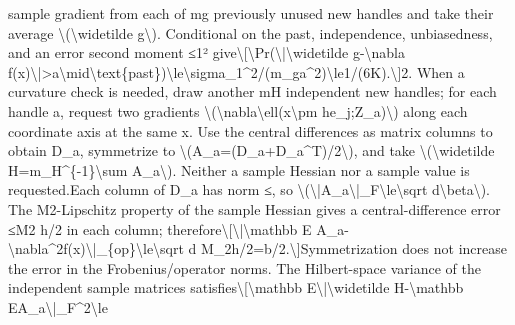 \documentclass[10pt,a4paper]{article}
\begin{document}
sample gradient from each of mg previously unused new handles and take their average \textbackslash{}(\textbackslash{}widetilde g\textbackslash{}). Conditional on the past,\allowbreak{} independence,\allowbreak{} unbiasedness,\allowbreak{} and an error second moment {\AtlasUnicodeSymbols ≤}\allowbreak{}1{\AtlasUnicodeText ²}\allowbreak{} give\newline{}\textbackslash{}[\newline{}\textbackslash{}Pr(\textbackslash{}|\textbackslash{}widetilde g-\textbackslash{}nabla f(x)\textbackslash{}|>a\textbackslash{}mid\textbackslash{}text\{past\})\textbackslash{}le\textbackslash{}sigma\_\allowbreak{}1\textasciicircum{}2/\allowbreak{}(m\_\allowbreak{}ga\textasciicircum{}2)\textbackslash{}le1/\allowbreak{}(6K).\newline{}\textbackslash{}]\newline{}2. When a curvature check is needed,\allowbreak{} draw another mH independent new handles;\allowbreak{} for each handle a,\allowbreak{} request two gradients \textbackslash{}(\textbackslash{}nabla\textbackslash{}ell(x\textbackslash{}pm he\_\allowbreak{}j;\allowbreak{}Z\_\allowbreak{}a)\textbackslash{}) along each coordinate axis at the same x. Use the central differences as matrix columns to obtain D\_\allowbreak{}a,\allowbreak{} symmetrize to \textbackslash{}(A\_\allowbreak{}a=\allowbreak{}(D\_\allowbreak{}a+D\_\allowbreak{}a\textasciicircum{}T)/\allowbreak{}2\textbackslash{}),\allowbreak{} and take \textbackslash{}(\textbackslash{}widetilde H=\allowbreak{}m\_\allowbreak{}H\textasciicircum{}\{-1\}\textbackslash{}sum A\_\allowbreak{}a\textbackslash{}). Neither a sample Hessian nor a sample value is requested.\newline{}\newline{}Each column of D\_\allowbreak{}a has norm {\AtlasUnicodeSymbols ≤}\allowbreak{},\allowbreak{} so \textbackslash{}(\textbackslash{}|A\_\allowbreak{}a\textbackslash{}|\_\allowbreak{}F\textbackslash{}le\textbackslash{}sqrt d\textbackslash{}beta\textbackslash{}). The M2-Lipschitz property of the sample Hessian gives a central-difference error {\AtlasUnicodeSymbols ≤}\allowbreak{}M2 h/\allowbreak{}2 in each column;\allowbreak{} therefore\newline{}\textbackslash{}[\newline{}\textbackslash{}|\textbackslash{}mathbb E A\_\allowbreak{}a-\textbackslash{}nabla\textasciicircum{}2f(x)\textbackslash{}|\_\allowbreak{}\{op\}\textbackslash{}le\textbackslash{}sqrt d M\_\allowbreak{}2h/\allowbreak{}2=\allowbreak{}b/\allowbreak{}2.\newline{}\textbackslash{}]\newline{}Symmetrization does not increase the error in the Frobenius/\allowbreak{}operator norms. The Hilbert-space variance of the independent sample matrices satisfies\newline{}\textbackslash{}[\newline{}\textbackslash{}mathbb E\textbackslash{}|\textbackslash{}widetilde H-\textbackslash{}mathbb EA\_\allowbreak{}a\textbackslash{}|\_\allowbreak{}F\textasciicircum{}2\textbackslash{}le 
\end{document}
